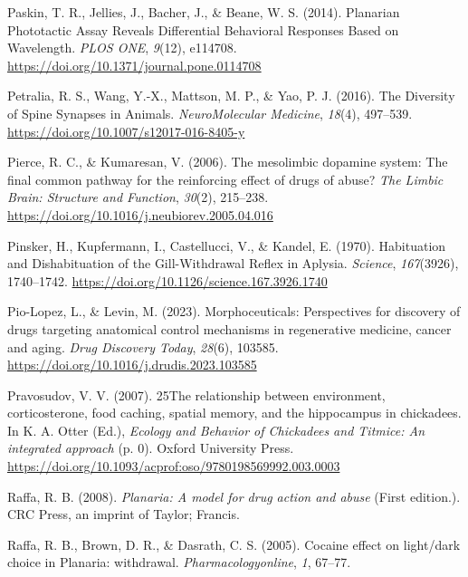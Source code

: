 \documentclass[
  jou,
  floatsintext,
  longtable,
  nolmodern,
  notxfonts,
  notimes,
  donotrepeattitle,
  colorlinks=true,linkcolor=blue,citecolor=blue,urlcolor=blue]{apa7}
\newlength{\cslhangindent}
\newenvironment{CSLReferences}[2] %
 {\begin{list}{}{%
  \setlength{\itemindent}{0pt}
  \setlength{\leftmargin}{0pt}
  \setlength{\parsep}{0pt}
  \ifodd #1
   \setlength{\leftmargin}{\cslhangindent}
   \setlength{\itemindent}{-1\cslhangindent}
  \fi
  \setlength{\itemsep}{#2\baselineskip}}}
 {\end{list}}
\begin{document}
\begin{CSLReferences}{1}{0}
Paskin, T. R., Jellies, J., Bacher, J., \& Beane, W. S. (2014).
Planarian {Phototactic} {Assay} {Reveals} {Differential} {Behavioral}
{Responses} {Based} on {Wavelength}. \emph{PLOS ONE}, \emph{9}(12),
e114708. \url{https://doi.org/10.1371/journal.pone.0114708}

Petralia, R. S., Wang, Y.-X., Mattson, M. P., \& Yao, P. J. (2016). The
{Diversity} of {Spine} {Synapses} in {Animals}. \emph{NeuroMolecular
Medicine}, \emph{18}(4), 497--539.
\url{https://doi.org/10.1007/s12017-016-8405-y}

Pierce, R. C., \& Kumaresan, V. (2006). The mesolimbic dopamine system:
{The} final common pathway for the reinforcing effect of drugs of abuse?
\emph{The Limbic Brain: Structure and Function}, \emph{30}(2), 215--238.
\url{https://doi.org/10.1016/j.neubiorev.2005.04.016}

Pinsker, H., Kupfermann, I., Castellucci, V., \& Kandel, E. (1970).
Habituation and {Dishabituation} of the {Gill}-{Withdrawal} {Reflex} in
{Aplysia}. \emph{Science}, \emph{167}(3926), 1740--1742.
\url{https://doi.org/10.1126/science.167.3926.1740}

Pio-Lopez, L., \& Levin, M. (2023). Morphoceuticals: {Perspectives} for
discovery of drugs targeting anatomical control mechanisms in
regenerative medicine, cancer and aging. \emph{Drug Discovery Today},
\emph{28}(6), 103585. \url{https://doi.org/10.1016/j.drudis.2023.103585}

Pravosudov, V. V. (2007). {25The} relationship between environment,
corticosterone, food caching, spatial memory, and the hippocampus in
chickadees. In K. A. Otter (Ed.), \emph{Ecology and {Behavior} of
{Chickadees} and {Titmice}: An integrated approach} (p. 0). Oxford
University Press.
\url{https://doi.org/10.1093/acprof:oso/9780198569992.003.0003}

Raffa, R. B. (2008). \emph{Planaria: A model for drug action and abuse}
(First edition.). CRC Press, an imprint of Taylor; Francis.

Raffa, R. B., Brown, D. R., \& Dasrath, C. S. (2005). Cocaine effect on
light/dark choice in {Planaria}: withdrawal. \emph{Pharmacologyonline},
\emph{1}, 67--77.


\end{CSLReferences}
\end{document}
